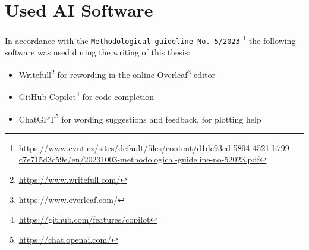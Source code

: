 \renewcommand{\thechapter}{B}
\renewcommand\chaptername{Appendix B}

\chapter{Used AI Software}

\noindent In accordance with the \texttt{Methodological guideline No. 5/2023}
\footnote{\url{https://www.cvut.cz/sites/default/files/content/d1dc93cd-5894-4521-b799-c7e715d3c59e/en/20231003-methodological-guideline-no-52023.pdf}}
the following software was used during the writing of this thesis:
\begin{itemize}
    \item {Writefull\footnote{\url{https://www.writefull.com/}} for rewording in the online Overleaf\footnote{\url{https://www.overleaf.com/}} editor}
    \item {GitHub Copilot\footnote{\url{https://github.com/features/copilot}} for code completion}
    \item {ChatGPT\footnote{\url{https://chat.openai.com/}} for wording suggestions and feedback, for plotting help}
\end{itemize}